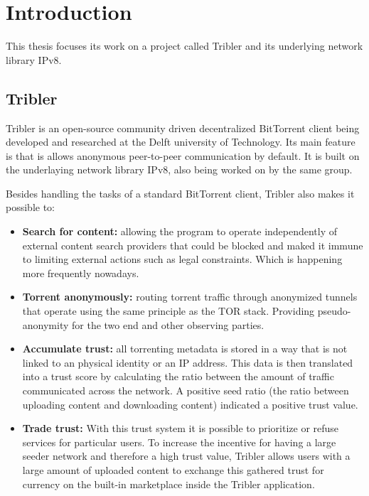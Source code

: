 \chapter{Introduction}


This thesis focuses its work on a project called Tribler and its underlying network library IPv8.

\section{Tribler}


Tribler is an open-source community driven decentralized BitTorrent client being developed and researched at the Delft university of Technology. Its main feature is that is allows anonymous peer-to-peer communication by default. It is built on the underlaying network library IPv8, also being worked on by the same group.

Besides handling the tasks of a standard BitTorrent client, Tribler also makes it possible to:

\begin{itemize}
	\item \textbf{Search for content: } allowing the program to operate independently of external content search providers that could be blocked and maked it immune to limiting external actions such as legal constraints. Which is happening more frequently nowadays.
	\item \textbf{Torrent anonymously: } routing torrent traffic through anonymized tunnels that operate using the same principle as the TOR stack. Providing pseudo-anonymity for the two end and other observing parties.
	\item \textbf{Accumulate trust: } all torrenting metadata is stored in a way that is not linked to an physical identity or an IP address. This data is then translated into a trust score by calculating the ratio between the amount of traffic communicated across the network. A positive seed ratio (the ratio between uploading content and downloading content) indicated a positive trust value.
	\item \textbf{Trade trust: } With this trust system it is possible to prioritize or refuse services for particular users. To increase the incentive for having a large seeder network and therefore a high trust value, Tribler allows users with a large amount of uploaded content to exchange this gathered trust for currency on the built-in marketplace inside the Tribler application.
\end{itemize}

